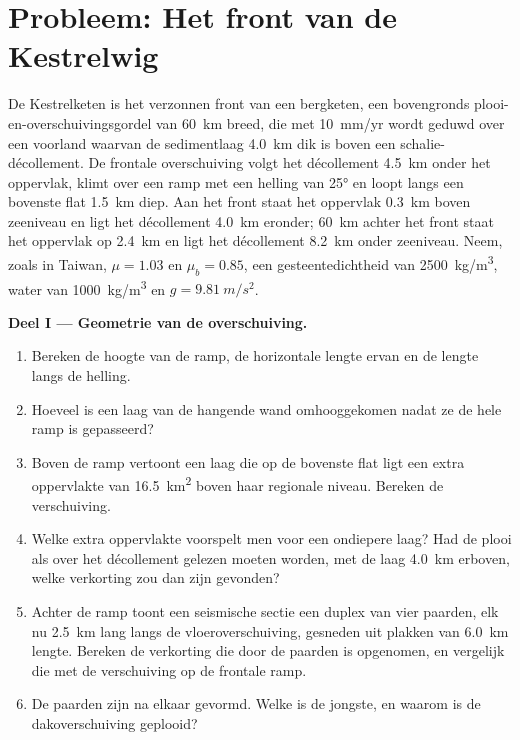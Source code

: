 \section{Probleem: Het front van de Kestrelwig}

\begin{problem}
\label{pb:b3:orogenic-wedges:1}
De Kestrelketen is het verzonnen front van een bergketen, een bovengronds
plooi-en-overschuivingsgordel van \qty{60}{km} breed, die met \qty{10}{mm/yr} wordt geduwd over een
voorland waarvan de sedimentlaag \qty{4.0}{km} dik is boven een
schalie-décollement. De frontale overschuiving volgt het décollement \qty{4.5}{km} onder
het oppervlak, klimt over een ramp met een helling van \ang{25} en loopt langs een bovenste flat
\qty{1.5}{km} diep. Aan het front staat het oppervlak \qty{0.3}{km} boven zeeniveau
en ligt het décollement \qty{4.0}{km} eronder; \qty{60}{km} achter het front staat het oppervlak
op \qty{2.4}{km} en ligt het décollement
\qty{8.2}{km} onder zeeniveau. Neem, zoals in Taiwan, $\mu = 1.03$ en $\mu_b =
0.85$, een gesteentedichtheid van \qty{2500}{kg/m^3}, water van \qty{1000}{kg/m^3} en
$g = \qty{9.81}{m/s^2}$.

\medskip\noindent\textbf{Deel I --- Geometrie van de overschuiving.}
\begin{enumerate}
  \item Bereken de hoogte van de ramp, de horizontale lengte ervan en de lengte
        langs de helling.
  \item Hoeveel is een laag van de hangende wand omhooggekomen nadat ze
        de hele ramp is gepasseerd?
  \item Boven de ramp vertoont een laag die op de bovenste flat ligt een extra oppervlakte
        van \qty{16.5}{km^2} boven haar regionale niveau. Bereken de verschuiving.
  \item Welke extra oppervlakte voorspelt men voor een ondiepere laag? Had de plooi
        als  over het décollement gelezen moeten worden, met de laag
        \qty{4.0}{km} erboven, welke verkorting zou dan zijn gevonden?
  \item Achter de ramp toont een seismische sectie een duplex van vier paarden, elk
        nu \qty{2.5}{km} lang langs de vloeroverschuiving, gesneden uit plakken van
        \qty{6.0}{km} lengte. Bereken de verkorting die door de paarden is opgenomen, en
        vergelijk die met de verschuiving op de frontale ramp.
  \item De paarden zijn na elkaar gevormd. Welke is de jongste, en waarom is de
        dakoverschuiving geplooid?
\end{enumerate}


\end{problem}
